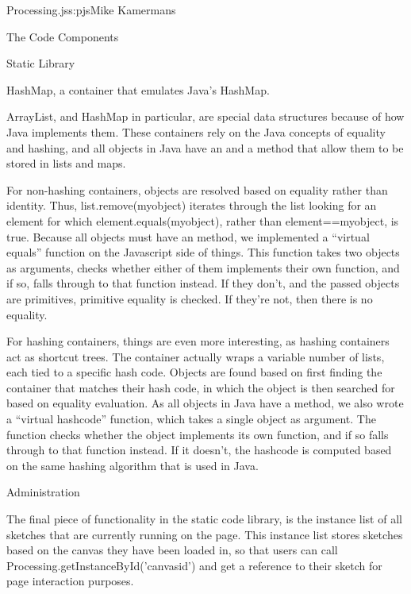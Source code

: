 \begin{aosachapter}{Processing.js}{s:pjs}{Mike Kamermans}
\begin{aosasect1}{The Code Components}
\begin{aosasect2}{Static Library}
\begin{aosaitemize}
\item HashMap, a container that emulates Java's HashMap.

ArrayList, and HashMap in particular, are special data structures
because of how Java implements them. These containers rely on the Java
concepts of equality and hashing, and all objects in Java have an
 and a  method that allow them to be
stored in lists and maps.

For non-hashing containers, objects are resolved based on equality
rather than identity. Thus, list.remove(myobject) iterates through the
list looking for an element for which element.equals(myobject), rather
than element==myobject, is true. Because all objects must have an
 method, we implemented a ``virtual equals'' function on
the Javascript side of things. This function takes two objects as
arguments, checks whether either of them implements their own
 function, and if so, falls through to that function
instead. If they don't, and the passed objects are primitives,
primitive equality is checked. If they're not, then there is no
equality.

For hashing containers, things are even more interesting, as hashing
containers act as shortcut trees. The container actually wraps a
variable number of lists, each tied to a specific hash code. Objects
are found based on first finding the container that matches their hash
code, in which the object is then searched for based on equality
evaluation. As all objects in Java have a  method, we also
wrote a ``virtual hashcode'' function, which takes a single object as
argument. The function checks whether the object implements its own
 function, and if so falls through to that function
instead. If it doesn't, the hashcode is computed based on the same
hashing algorithm that is used in Java.

\end{aosaitemize}

\end{aosasect2}

\begin{aosasect2}{Administration}

The final piece of functionality in the static code library, is the
instance list of all sketches that are currently running on the
page. This instance list stores sketches based on the canvas they have
been loaded in, so that users can call
Processing.getInstanceById('canvasid') and get a reference to their
sketch for page interaction purposes.


\end{aosasect2}
\end{aosasect1}
\end{aosachapter}

